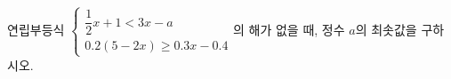 연립부등식 $\begin{cases} \dfrac{1}{2}x+1<3x-a \\[4pt] 0.2(5-2x)\ge 0.3x-0.4 \end{cases}$의 해가 없을 때, 정수 $a$의 최솟값을 구하시오.
